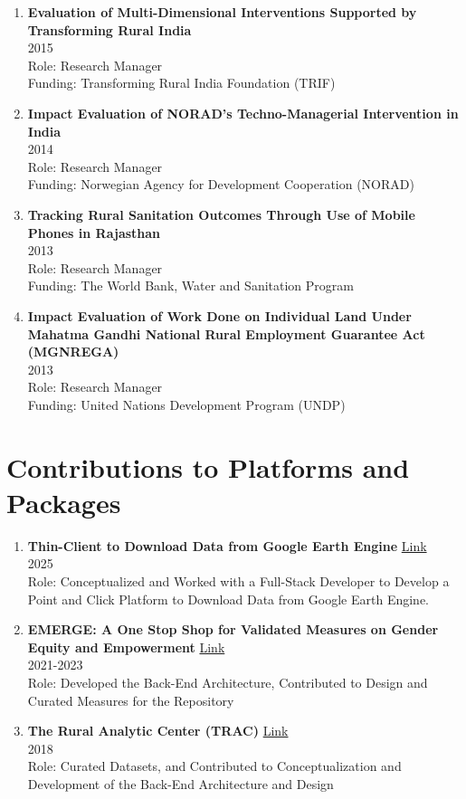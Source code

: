 \documentclass[13pt,letterpaper]{article}
\begin{document}
\begin{enumerate}
\item \textbf{Evaluation of Multi-Dimensional Interventions Supported by Transforming Rural India} \\
2015 \\
Role: Research Manager \\
Funding: Transforming Rural India Foundation (TRIF) 

\item \textbf{Impact Evaluation of NORAD's Techno-Managerial Intervention in India} \\
2014 \\
Role: Research Manager \\
Funding: Norwegian Agency for Development Cooperation (NORAD) 

\item \textbf{Tracking Rural Sanitation Outcomes Through Use of Mobile Phones in Rajasthan} \\
2013 \\
Role: Research Manager \\
Funding: The World Bank, Water and Sanitation Program 

\item \textbf{Impact Evaluation of Work Done on Individual Land Under Mahatma Gandhi National Rural Employment Guarantee Act (MGNREGA)} \\
2013 \\
Role: Research Manager \\
Funding: United Nations Development Program (UNDP) 
\end{enumerate}
\section*{Contributions to Platforms and Packages}
\label{sec:orgd9dc8ac}
\begin{enumerate}
\item \textbf{Thin-Client to Download Data from Google Earth Engine} \href{Https://Github.Com/Thrcle421/Thin-Client-For-Google-Earth-Engine}{Link} \\
2025 \\
Role: Conceptualized and Worked with a Full-Stack Developer to Develop a Point and Click Platform to Download Data from Google Earth Engine. 

\item \textbf{EMERGE: A One Stop Shop for Validated Measures on Gender Equity and Empowerment} \href{Https://Emerge.Ucsd.Edu/}{Link} \\
2021-2023 \\
Role: Developed the Back-End Architecture, Contributed to Design and Curated Measures for the Repository 

\item \textbf{The Rural Analytic Center (TRAC)} \href{Https://Www.Tracindia.Org/Page/Data-Visualization}{Link} \\
2018 \\
Role: Curated Datasets, and Contributed to Conceptualization and Development of the Back-End Architecture and Design 
\end{enumerate}
\end{document}
